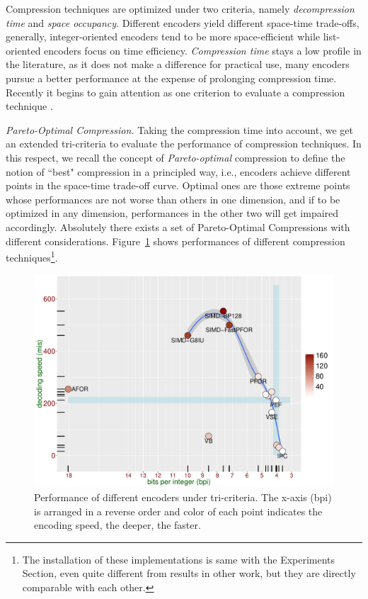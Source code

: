 \documentclass[runningheads,a4paper]{llncs}
\begin{document}
Compression techniques are optimized under two criteria, namely \textit{decompression time} and \textit{space occupancy}.
Different encoders yield different space-time trade-offs, generally, integer-oriented encoders tend to be more space-efficient while list-oriented encoders focus on time efficiency.
\textit{Compression time} stays a low profile in the literature, as it does not make a difference for practical use, many encoders pursue a better performance at the expense of prolonging compression time.
Recently it begins to gain attention as one criterion to evaluate a compression technique \cite{lemire2015decoding,ottaviano2015optimal}.

\textit{Pareto-Optimal Compression.}
Taking the compression time into account, we get an extended tri-criteria to evaluate the performance of compression techniques.
In this respect, we recall the concept of \textit{Pareto-optimal} compression to define the notion of ``best" compression in a principled way, i.e., encoders achieve different points in the space-time trade-off curve.
Optimal ones are those extreme points whose performances are not worse than others in one dimension, and if to be optimized in any dimension, performances in the other two will get impaired accordingly.
Absolutely there exists a set of Pareto-Optimal Compressions with different considerations.
Figure~\ref{fig:performance} shows performances of different compression techniques\footnote{The installation of these implementations is same with the Experiments Section, even quite different from results in other work, but they are directly comparable with each other.}.

\begin{figure}
	\centering
	\includegraphics[width=0.7\linewidth]{performance}
	\caption{Performance of different encoders under tri-criteria. The x-axis (bpi) is arranged in a reverse order and color of each point indicates the encoding speed, the deeper, the faster.}
	\label{fig:performance}
\end{figure}
\end{document}
